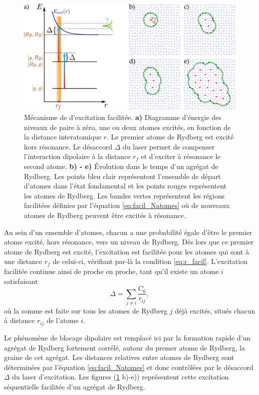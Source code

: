 \begin{figure}[!h]
\centering
\includegraphics[height=.3\textheight]{figures/low_l/dip_facil}
\caption[Mécanisme de d'excitation facilitée]{
Mécanisme de d'excitation facilitée.
\textbf{a)} Diagramme d'énergie des niveaux de paire à zéro, une ou deux atomes excités, en fonction de la distance interatomique $r$.
Le premier atome de Rydberg est excité hors résonance.
Le désaccord $\Delta$ du laser permet de compenser l'interaction dipolaire à la distance $r_f$ et d'exciter à résonance le second atome.
\textbf{b) - e)} Évolution dans le temps d'un agrégat de Rydberg.
Les points bleu clair représentent l'ensemble de départ d'atomes dans l'état fondamental et les points rouges représentent les atomes de Rydberg.
Les bandes vertes représentent les régions \og facilitées \fg{} définies par l'équation \eqref{eq:facil_Natomes} où de nouveaux atomes de Rydberg peuvent être excités à résonance.
}
\label{fig:dip_facil}
\end{figure}

Au sein d'un ensemble d'atomes, chacun a une probabilité égale d'être le premier atome excité, hors résonance, vers un niveau de Rydberg.
Dès lors que ce premier atome de Rydberg est excité, l'excitation est facilitée pour les atomes qui sont à une distance $r_f$ de celui-ci, vérifiant par-là la condition \eqref{eq:r_facil}.
L'excitation facilitée continue ainsi de proche en proche, tant qu'il existe un atome $i$ satisfaisant
\begin{equation}
\label{eq:facil_Natomes}
\Delta = \sum_{j\neq i} {\frac{C_6}{r_{ij}}},
\end{equation}
où la somme est faite sur tous les atomes de Rydberg $j$ déjà excités, situés chacun à distance $r_{ij}$ de l'atome $i$.

Le phénomène de blocage dipolaire est remplacé ici par la formation rapide d'un \og agrégat de Rydberg \fg{} fortement corrélé, autour du premer atome de Rydberg, la \og graine \fg{} de cet agrégat.
Les distances relatives entre atomes de Rydberg sont déterminées par l'équation \eqref{eq:facil_Natomes} et donc contrôlées par le désaccord $\Delta$ du laser d'excitation.
Les figures (\ref{fig:dip_facil} b)-e)) représentent cette excitation séquentielle facilitée d'un agrégat de Rydberg.


